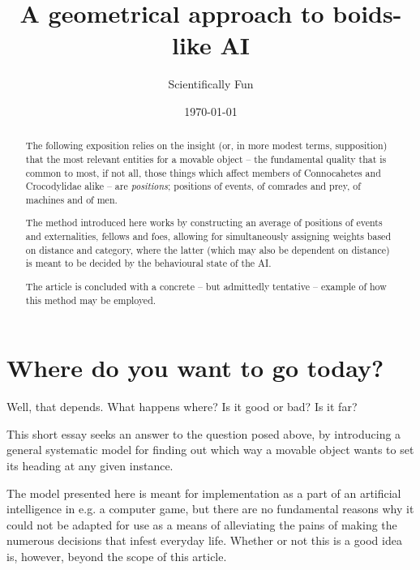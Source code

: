 \documentclass[]{article} %
\title{A geometrical approach to boids-like AI}
\author{Scientifically Fun}
\date{\today}
\begin{document}
\maketitle


\begin{abstract}
\footnotesize
\noindent  The following exposition relies on the insight (or, in more modest terms, supposition) that the most relevant entities for a movable object -- the fundamental quality that is common to most, if not all, those things which affect members of Connocahetes and Crocodylidae alike -- are \emph{positions}; positions of events, of comrades and prey, of machines and of men.

The method introduced here works by constructing an average of positions of events and externalities, fellows and foes, allowing for simultaneously assigning weights based on distance and category, where the latter (which may also be dependent on distance) is meant to be decided by the behavioural state of the AI. 

The article is concluded with a concrete -- but admittedly tentative -- example of how this method may be employed.
\end{abstract}

\tableofcontents

\thispagestyle{empty}

\newpage

\section{Where do you want to go today?}
\label{sec:introduction}
Well, that depends. What happens where? Is it good or bad? Is it far?

This short essay seeks an answer to the question posed above, by introducing a general systematic model for finding out which way a movable object wants to set its heading at any given instance.

The model presented here is meant for implementation as a part of an artificial intelligence in e.g. a computer game, but there are no fundamental reasons why it could not be adapted for use as a means of alleviating the pains of making the numerous decisions that infest everyday life.
Whether or not this is a good idea is, however, beyond the scope of this article.
\end{document}
